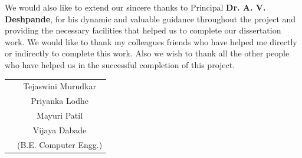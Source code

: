 \documentclass[oneside,a4paper,12pt]{book}
\begin{document}
{We would also like to extend our sincere thanks to Principal {\bfseries \fontsize{12}{12} \selectfont Dr. A. V. Deshpande}, for his dynamic and valuable guidance throughout the project and providing the necessary facilities that helped us to complete our dissertation work. We would like to thank my colleagues friends who have helped me directly or indirectly to complete this work. Also we wish to thank all the other people who have helped us in the successful completion of this project.}
\vspace*{1.0\baselineskip}


\vspace*{3\baselineskip} 
\begin{tabular}{p{8.2cm}c}
&Tejaswini Murudkar\\
&Priyanka Lodhe\\
&Mayuri Patil\\
&Vijaya Dabade\\
&(B.E. Computer Engg.)
\end{tabular}

\end{document}
